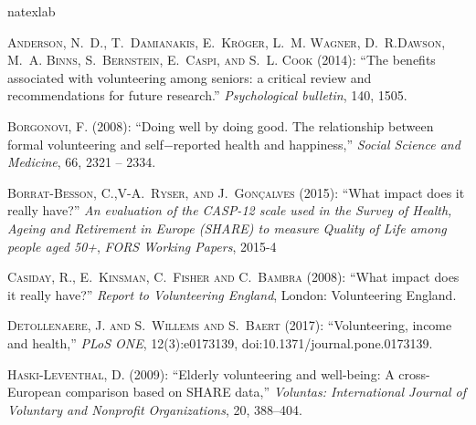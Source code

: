 \documentclass[10pt, letterpaper]{article}
\begin{document}
\begin{spacing}{1.4}
\begin{thebibliography}{87}
\newcommand{\enquote}[1]{``#1''}
\expandafter\ifx\csname natexlab\endcsname\relax\def\natexlab#1{#1}\fi

\textsc{Anderson, N.~D., T.~Damianakis, E.~Kr{\"o}ger, L.~M. Wagner, D.~R.Dawson, M.~A. Binns, S.~Bernstein, E.~Caspi, and S.~L. Cook} (2014):  \enquote{The benefits associated with volunteering among seniors: a critical  review and recommendations for future research.} \emph{Psychological bulletin}, 140, 1505.


\textsc{Borgonovi, F.} (2008): \enquote{Doing well by doing good. The relationship between formal volunteering and self$-$reported health and happiness,} \emph{Social Science and Medicine}, 66,  2321 -- 2334.

\textsc{Borrat-Besson, C.,V-A.~Ryser, and J.~Gonçalves} (2015):  \enquote{What impact does it really have?} \emph{An evaluation of the CASP-12 scale used in the Survey of Health, Ageing and Retirement in Europe (SHARE) to measure Quality of Life among people aged 50+}, \emph{FORS Working Papers}, 2015-4


\textsc{Casiday, R., E.~Kinsman, C.~Fisher and C.~Bambra} (2008):  \enquote{What impact does it really have?} \emph{Report to Volunteering England}, London: Volunteering England.

\textsc{Detollenaere, J. and S.~Willems and S.~Baert} (2017): \enquote{Volunteering, income and health,} \emph{PLoS ONE}, 12(3):e0173139,  doi:10.1371/journal.pone.0173139.

\textsc{Haski-Leventhal, D.} (2009): \enquote{Elderly volunteering and
  well-being: A cross-European comparison based on SHARE data,} \emph{Voluntas:
  International Journal of Voluntary and Nonprofit Organizations}, 20,
  388--404.
  

\end{thebibliography}
\end{spacing}
\end{document}
